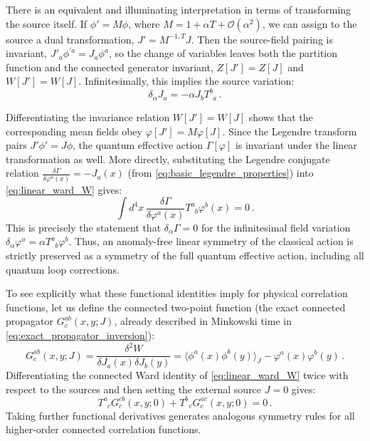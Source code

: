 There is an equivalent and illuminating interpretation in terms of transforming the source itself. If \(\phi' = M\phi\), where \(M = 1 + \alpha T + \mathcal{O}(\alpha^2)\), we can assign to the source a dual transformation, \(J' = M^{-1, T} J\). Then the source-field pairing is invariant, \(J'_a \phi^{\prime a} = J_a \phi^a\), so the change of variables leaves both the partition function and the connected generator invariant, \(Z[J'] = Z[J]\) and \(W[J'] = W[J]\). Infinitesimally, this implies the source variation:
\begin{equation} \label{eq:source_infinitesimal_transform}
    \delta_\alpha J_a = -\alpha J_b T^b_{\phantom{b}a} \, .
\end{equation}

Differentiating the invariance relation \(W[J'] = W[J]\) shows that the corresponding mean fields obey \(\varphi[J'] = M\varphi[J]\). Since the Legendre transform pairs \(J'\phi' = J\phi\), the quantum effective action \(\Gamma[\varphi]\) is invariant under the linear transformation as well. More directly, substituting the Legendre conjugate relation \(\frac{\delta \Gamma}{\delta \varphi^a(x)} = -J_a(x)\) (from \eqref{eq:basic_legendre_properties}) into \eqref{eq:linear_ward_W} gives:
\begin{equation} \label{eq:linear_ward_Gamma}
    \boxed{\int d^4x \, \frac{\delta \Gamma}{\delta \varphi^a(x)} T^a_{\phantom{a}b} \varphi^b(x) = 0} \, .
\end{equation}
This is precisely the statement that \(\delta_\alpha \Gamma = 0\) for the infinitesimal field variation \(\delta_\alpha \varphi^a = \alpha T^a_{\phantom{a}b}\varphi^b\). Thus, an anomaly-free linear symmetry of the classical action is strictly preserved as a symmetry of the full quantum effective action, including all quantum loop corrections.

To see explicitly what these functional identities imply for physical correlation functions, let us define the connected two-point function (the exact connected propagator \(G_c^{ab}(x,y; J)\), already described in Minkowski time in \eqref{eq:exact_propagator_inversion}):
\begin{equation} \label{eq:connected_two_point_def}
    G_c^{ab}(x, y; J) = \frac{\delta^2 W}{\delta J_a(x) \delta J_b(y)} = \langle \phi^a(x)\phi^b(y) \rangle_J - \varphi^a(x)\varphi^b(y) \, .
\end{equation}
Differentiating the connected Ward identity of \eqref{eq:linear_ward_W} twice with respect to the sources and then setting the external source \(J = 0\) gives:
\begin{equation} \label{eq:two_point_ward_identity}
    T^a_{\phantom{a}c} G_c^{cb}(x, y; 0) + T^b_{\phantom{a}c} G_c^{ac}(x, y; 0) = 0 \, .
\end{equation}
Taking further functional derivatives generates analogous symmetry rules for all higher-order connected correlation functions.

